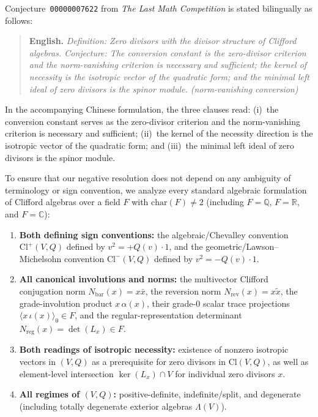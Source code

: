 \documentclass[11pt]{article}
\theoremstyle{definition}
\newcommand{\Cl}{\mathrm{Cl}}
\newcommand{\Nbar}{N_{\mathrm{bar}}}
\newcommand{\Nrev}{N_{\mathrm{rev}}}
\newcommand{\Nreg}{N_{\mathrm{reg}}}
\begin{document}
Conjecture~\texttt{00000007622} from \emph{The Last Math Competition} is stated
bilingually as follows:
\begin{quote}
\textbf{English.} \emph{Definition: Zero divisors with the divisor structure of
Clifford algebras. Conjecture: The conversion constant is the zero-divisor
criterion and the norm-vanishing criterion is necessary and sufficient; the kernel
of necessity is the isotropic vector of the quadratic form; and the minimal left
ideal of zero divisors is the spinor module. (norm-vanishing conversion)}
\end{quote}
In the accompanying Chinese formulation, the three clauses read:
(i)~the conversion constant serves as the zero-divisor criterion and the
norm-vanishing criterion is necessary and sufficient;
(ii)~the kernel of the necessity direction is the isotropic vector of the
quadratic form; and
(iii)~the minimal left ideal of zero divisors is the spinor module.

To ensure that our negative resolution does not depend on any ambiguity of
terminology or sign convention, we analyze every standard algebraic formulation
of Clifford algebras over a field $F$ with $\mathrm{char}(F) \neq 2$ (including
$F = \mathbb{Q}$, $F = \mathbb{R}$, and $F = \mathbb{C}$):
\begin{enumerate}
  \item \textbf{Both defining sign conventions:} the algebraic/Chevalley convention
    $\Cl^+(V, Q)$ defined by $v^2 = +Q(v)\cdot 1$, and the geometric/Lawson--Michelsohn
    convention $\Cl^-(V, Q)$ defined by $v^2 = -Q(v)\cdot 1$.
  \item \textbf{All canonical involutions and norms:} the multivector Clifford
    conjugation norm $\Nbar(x) = x\bar{x}$, the reversion norm $\Nrev(x) = x\tilde{x}$,
    the grade-involution product $x\,\alpha(x)$, their grade-$0$ scalar trace
    projections $\langle x\,\iota(x)\rangle_0 \in F$, and the regular-representation
    determinant $\Nreg(x) = \det(L_x) \in F$.
  \item \textbf{Both readings of isotropic necessity:} existence of nonzero
    isotropic vectors in $(V, Q)$ as a prerequisite for zero divisors in
    $\Cl(V, Q)$, as well as element-level intersection $\ker(L_x) \cap V$ for
    individual zero divisors $x$.
  \item \textbf{All regimes of $(V, Q)$:} positive-definite, indefinite/split,
    and degenerate (including totally degenerate exterior algebras $\Lambda(V)$).
\end{enumerate}
\end{document}
